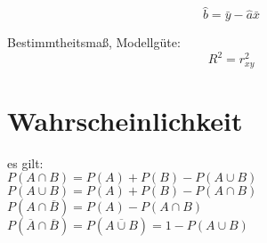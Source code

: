 \documentclass[a4paper, twocolumn]{article}
\begin{document}
        \begin{displaymath}
            \hat b = \bar y - \hat a \bar x
        \end{displaymath}
        
        Bestimmtheitsmaß, Modellgüte:
        \begin{displaymath}
          R^2 = r^2_{xy}
        \end{displaymath}
        
\section{Wahrscheinlichkeit}
	es gilt:\\
		$ P(A \cap B) = P(A) + P(B) - P(A \cup B)  $ \\
		$ P(A \cup B) = P(A) + P(B) - P(A \cap B) $ \\
		$ P(A \cap \overline B) = P(A) - P(A \cap B) $ \\
		$ P(\overline A  \cap \overline B) = P(\overline{A \cup B}) = 1 - P(A \cup B) $
\end{document}

